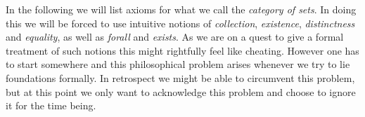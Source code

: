 



	In the following we will list axioms for what we call the \textit{category of sets}. In doing this we will be forced to use intuitive notions of \textit{collection}, \textit{existence}, \textit{distinctness} and \textit{equality}, as well as \textit{forall} and \textit{exists}. As we are on a quest to give a formal treatment of such notions this might rightfully feel like cheating. However one has to start somewhere and this philosophical problem arises whenever we try to lie foundations formally. In retrospect we might be able to circumvent this problem, but at this point we only want to acknowledge this problem and choose to ignore it for the time being.


